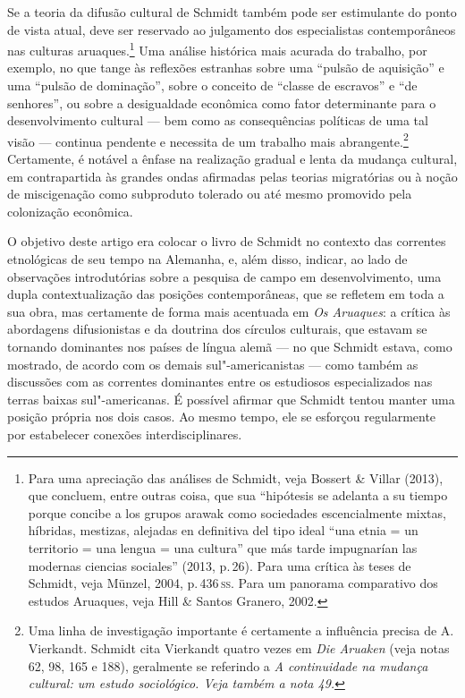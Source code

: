 Se a teoria da difusão cultural de Schmidt também pode ser estimulante
do ponto de vista atual, deve ser reservado ao julgamento dos
especialistas contemporâneos nas culturas aruaques.\footnote{Para uma
  apreciação das análises de Schmidt, veja Bossert \& Villar (2013), que
  concluem, entre outras coisa, que sua ``hipótesis se adelanta a su
  tiempo porque concibe a los grupos arawak como sociedades
  escencialmente mixtas, híbridas, mestizas, alejadas en definitiva del
  tipo ideal ``una etnia = un territorio = una lengua = una cultura'' que
  más tarde impugnarían las modernas ciencias sociales'' (2013, p.\,26).
  Para uma crítica às teses de Schmidt, veja Münzel, 2004, p.\,436\,\textsc{ss}.
  Para um panorama comparativo dos estudos Aruaques, veja Hill \& Santos
  Granero, 2002.} Uma análise histórica mais acurada do trabalho, por
exemplo, no que tange às reflexões estranhas sobre uma ``pulsão de
aquisição'' e uma ``pulsão de dominação'', sobre o conceito de ``classe
de escravos'' e ``de senhores'', ou sobre a desigualdade econômica como
fator determinante para o desenvolvimento cultural --- bem como as
consequências políticas de uma tal visão --- continua pendente e
necessita de um trabalho mais abrangente.\footnote{Uma linha de
  investigação importante é certamente a influência precisa de A.
  Vierkandt. Schmidt cita Vierkandt quatro vezes em \textit{Die Aruaken}
  (veja notas 62, 98, 165 e 188), geralmente se referindo a \textit{A
  continuidade na mudança cultural: um estudo sociológico. Veja
  também a nota 49.}} Certamente, é notável a ênfase na realização
gradual e lenta da mudança cultural, em contrapartida às grandes ondas
afirmadas pelas teorias migratórias ou à noção de miscigenação como
subproduto tolerado ou até mesmo promovido pela colonização econômica.

O objetivo deste artigo era colocar o livro de Schmidt no contexto das
correntes etnológicas de seu tempo na Alemanha, e, além disso, indicar,
ao lado de observações introdutórias sobre a pesquisa de campo em
desenvolvimento, uma dupla contextualização das posições contemporâneas,
que se refletem em toda a sua obra, mas certamente de forma mais
acentuada em \textit{Os Aruaques}: a crítica às abordagens difusionistas e
da doutrina dos círculos culturais, que estavam se tornando dominantes
nos países de língua alemã --- no que Schmidt estava, como mostrado, de
acordo com os demais sul"-americanistas --- como também as discussões com
as correntes dominantes entre os estudiosos especializados nas terras
baixas sul"-americanas. É possível afirmar que Schmidt tentou manter uma
posição própria nos dois casos. Ao mesmo tempo, ele se esforçou
regularmente por estabelecer conexões interdisciplinares.

